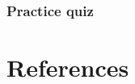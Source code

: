 \documentclass[]{tufte-book}
\begin{document}
\hypertarget{practice-quiz-4}{%
\subsection{Practice quiz}\label{practice-quiz-4}}

\hypertarget{references}{%
\chapter{References}\label{references}}


\end{document}
